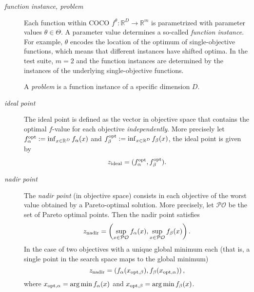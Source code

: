 \documentclass[letterpaper,12pt,english]{article}
\begin{document}
\begin{description}
\item[{\emph{function instance, problem}}] \leavevmode
Each function within COCO \(f^\theta: \mathbb{R}^D \to \mathbb{R}^m\) is parametrized
with parameter values \(\theta \in \Theta\). A parameter value determines a so-called \emph{function
instance}. For example, \(\theta\) encodes the location of the optimum of single-objective functions,
which means that different instances have shifted optima. In the 
test suite, \(m=2\) and the function instances are determined by the instances of the underlying
single-objective functions.

A \emph{problem} is a function instance of a specific dimension \(D\).

\item[{\emph{ideal point}}] \leavevmode
The ideal point is defined as the vector in objective space that
contains the optimal \(f\)-value for each objective \emph{independently}.
More precisely let \(f_\alpha^{\rm opt}:= \inf_{x\in \mathbb{R}^D} f_\alpha(x)\) and
\(f_\beta^{\rm opt}:= \inf_{x\in \mathbb{R}^D} f_\beta(x)\), the ideal point is given by
    \begin{equation*}
    z_{\rm ideal}  =  (f_\alpha^{\rm opt},f_\beta^{\rm opt}).
\end{equation*}
\item[{\emph{nadir point}}] \leavevmode
The \emph{nadir point} (in objective space) consists in each objective of
the worst value obtained by a Pareto-optimal solution. More precisely,
let \(\mathcal{PO}\) be the set of Pareto optimal points. Then the nadir point satisfies
    \begin{equation*}
    z_{\rm nadir}  =   \left( \sup_{x \in \mathcal{PO}} f_\alpha(x),
 \sup_{x \in \mathcal{PO}} f_\beta(x)  \right).
\end{equation*}
In the case of two objectives with a unique global minimum each (that
is, a single point in the search space maps to the global minimum)
    \begin{equation*}
    z_{\rm nadir}  =   \left( f_\alpha(x_{\rm opt,\beta}),
  f_\beta(x_{\rm opt,\alpha})  \right),
\end{equation*}
where \(x_{\rm opt,\alpha}= \arg \min f_\alpha(x)\) and
\(x_{\rm opt,\beta}= \arg \min f_\beta(x)\).

\end{description}
\end{document}
